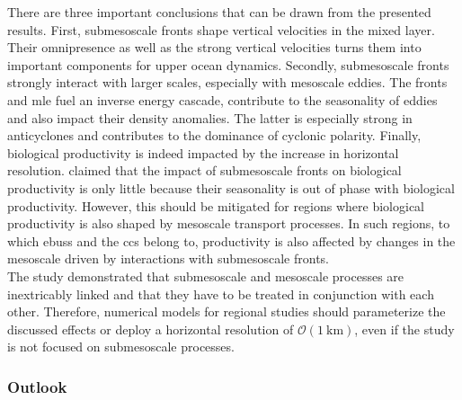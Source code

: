 There are three important conclusions that can be drawn from the presented results. First, submesoscale fronts shape vertical velocities in the mixed layer. Their omnipresence as well as the strong vertical velocities turns them into important components for upper ocean dynamics. Secondly, submesoscale fronts strongly interact with larger scales, especially with mesoscale eddies. The fronts and \ac{mle} fuel an inverse energy cascade, contribute to the seasonality of eddies and also impact their density anomalies. The latter is especially strong in anticyclones and contributes to the dominance of cyclonic polarity. Finally, biological productivity is indeed impacted by the increase in horizontal resolution. \Textcite{levy-2018-role-structuring} claimed that the impact of submesoscale fronts on biological productivity is only little because their seasonality is out of phase with biological productivity. However, this should be mitigated for regions where biological productivity is also shaped by mesoscale transport processes. In such regions, to which \acp{ebus} and the \ac{ccs} belong to, productivity is also affected by changes in the mesoscale driven by interactions with submesoscale fronts.\\
The study demonstrated that submesoscale and mesoscale processes are inextricably linked and that they have to be treated in conjunction with each other. Therefore, numerical models for regional studies should parameterize the discussed effects or deploy a horizontal resolution of $\mathcal{O}(\SI{1}{\kilo\metre})$, even if the study is not focused on submesoscale processes.

\subsubsection{Outlook}

